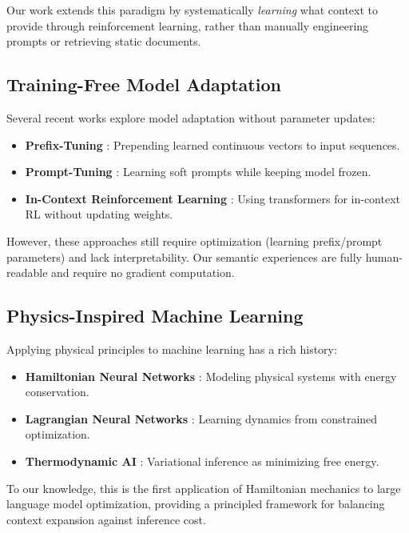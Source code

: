 Our work extends this paradigm by systematically \textit{learning} what context to provide through reinforcement learning, rather than manually engineering prompts or retrieving static documents.

\subsection{Training-Free Model Adaptation}

Several recent works explore model adaptation without parameter updates:
\begin{itemize}
    \item \textbf{Prefix-Tuning} \cite{li2021prefix}: Prepending learned continuous vectors to input sequences.
    \item \textbf{Prompt-Tuning} \cite{lester2021power}: Learning soft prompts while keeping model frozen.
    \item \textbf{In-Context Reinforcement Learning} \cite{laskin2022context}: Using transformers for in-context RL without updating weights.
\end{itemize}

However, these approaches still require optimization (learning prefix/prompt parameters) and lack interpretability. Our semantic experiences are fully human-readable and require no gradient computation.

\subsection{Physics-Inspired Machine Learning}

Applying physical principles to machine learning has a rich history:
\begin{itemize}
    \item \textbf{Hamiltonian Neural Networks} \cite{greydanus2019hamiltonian}: Modeling physical systems with energy conservation.
    \item \textbf{Lagrangian Neural Networks} \cite{cranmer2020lagrangian}: Learning dynamics from constrained optimization.
    \item \textbf{Thermodynamic AI} \cite{opper2009variational}: Variational inference as minimizing free energy.
\end{itemize}

To our knowledge, this is the first application of Hamiltonian mechanics to large language model optimization, providing a principled framework for balancing context expansion against inference cost.


